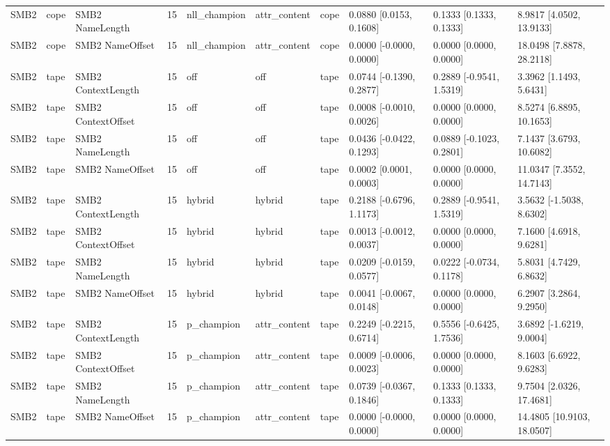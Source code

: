 \begin{tabular}{llllllllll}
SMB2 & cope & SMB2 NameLength & 15 & nll\_champion & attr\_content & cope & 0.0880 [0.0153, 0.1608] & 0.1333 [0.1333, 0.1333] & 8.9817 [4.0502, 13.9133] \\
SMB2 & cope & SMB2 NameOffset & 15 & nll\_champion & attr\_content & cope & 0.0000 [-0.0000, 0.0000] & 0.0000 [0.0000, 0.0000] & 18.0498 [7.8878, 28.2118] \\
SMB2 & tape & SMB2 ContextLength & 15 & off & off & tape & 0.0744 [-0.1390, 0.2877] & 0.2889 [-0.9541, 1.5319] & 3.3962 [1.1493, 5.6431] \\
SMB2 & tape & SMB2 ContextOffset & 15 & off & off & tape & 0.0008 [-0.0010, 0.0026] & 0.0000 [0.0000, 0.0000] & 8.5274 [6.8895, 10.1653] \\
SMB2 & tape & SMB2 NameLength & 15 & off & off & tape & 0.0436 [-0.0422, 0.1293] & 0.0889 [-0.1023, 0.2801] & 7.1437 [3.6793, 10.6082] \\
SMB2 & tape & SMB2 NameOffset & 15 & off & off & tape & 0.0002 [0.0001, 0.0003] & 0.0000 [0.0000, 0.0000] & 11.0347 [7.3552, 14.7143] \\
SMB2 & tape & SMB2 ContextLength & 15 & hybrid & hybrid & tape & 0.2188 [-0.6796, 1.1173] & 0.2889 [-0.9541, 1.5319] & 3.5632 [-1.5038, 8.6302] \\
SMB2 & tape & SMB2 ContextOffset & 15 & hybrid & hybrid & tape & 0.0013 [-0.0012, 0.0037] & 0.0000 [0.0000, 0.0000] & 7.1600 [4.6918, 9.6281] \\
SMB2 & tape & SMB2 NameLength & 15 & hybrid & hybrid & tape & 0.0209 [-0.0159, 0.0577] & 0.0222 [-0.0734, 0.1178] & 5.8031 [4.7429, 6.8632] \\
SMB2 & tape & SMB2 NameOffset & 15 & hybrid & hybrid & tape & 0.0041 [-0.0067, 0.0148] & 0.0000 [0.0000, 0.0000] & 6.2907 [3.2864, 9.2950] \\
SMB2 & tape & SMB2 ContextLength & 15 & p\_champion & attr\_content & tape & 0.2249 [-0.2215, 0.6714] & 0.5556 [-0.6425, 1.7536] & 3.6892 [-1.6219, 9.0004] \\
SMB2 & tape & SMB2 ContextOffset & 15 & p\_champion & attr\_content & tape & 0.0009 [-0.0006, 0.0023] & 0.0000 [0.0000, 0.0000] & 8.1603 [6.6922, 9.6283] \\
SMB2 & tape & SMB2 NameLength & 15 & p\_champion & attr\_content & tape & 0.0739 [-0.0367, 0.1846] & 0.1333 [0.1333, 0.1333] & 9.7504 [2.0326, 17.4681] \\
SMB2 & tape & SMB2 NameOffset & 15 & p\_champion & attr\_content & tape & 0.0000 [-0.0000, 0.0000] & 0.0000 [0.0000, 0.0000] & 14.4805 [10.9103, 18.0507] \\

\end{tabular}
